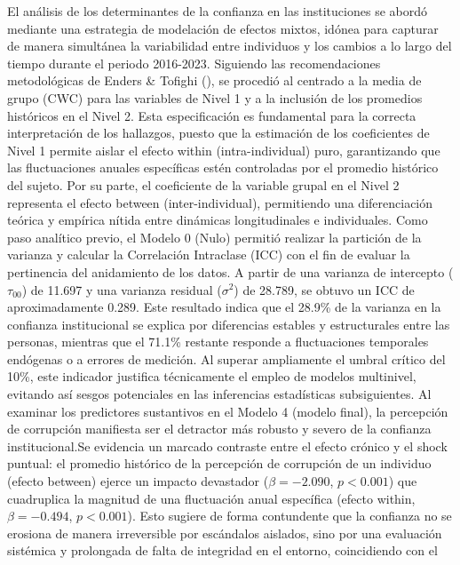 \documentclass[
  spanish,
  a4paper,
  oneside]{scrbook}
\begin{document}
El análisis de los determinantes de la confianza en las instituciones se
abordó mediante una estrategia de modelación de efectos mixtos, idónea
para capturar de manera simultánea la variabilidad entre individuos y
los cambios a lo largo del tiempo durante el periodo 2016-2023.
Siguiendo las recomendaciones metodológicas de Enders \& Tofighi
(), se procedió al centrado a
la media de grupo (CWC) para las variables de Nivel 1 y a la inclusión
de los promedios históricos en el Nivel 2. Esta especificación es
fundamental para la correcta interpretación de los hallazgos, puesto que
la estimación de los coeficientes de Nivel 1 permite aislar el efecto
within (intra-individual) puro, garantizando que las fluctuaciones
anuales específicas estén controladas por el promedio histórico del
sujeto. Por su parte, el coeficiente de la variable grupal en el Nivel 2
representa el efecto between (inter-individual), permitiendo una
diferenciación teórica y empírica nítida entre dinámicas longitudinales
e individuales. Como paso analítico previo, el Modelo 0 (Nulo) permitió
realizar la partición de la varianza y calcular la Correlación
Intraclase (ICC) con el fin de evaluar la pertinencia del anidamiento de
los datos. A partir de una varianza de intercepto (\(\tau_{00}\)) de
11.697 y una varianza residual (\(\sigma^2\)) de 28.789, se obtuvo un
ICC de aproximadamente 0.289. Este resultado indica que el 28.9\% de la
varianza en la confianza institucional se explica por diferencias
estables y estructurales entre las personas, mientras que el 71.1\%
restante responde a fluctuaciones temporales endógenas o a errores de
medición. Al superar ampliamente el umbral crítico del 10\%, este
indicador justifica técnicamente el empleo de modelos multinivel,
evitando así sesgos potenciales en las inferencias estadísticas
subsiguientes. Al examinar los predictores sustantivos en el Modelo 4
(modelo final), la percepción de corrupción manifiesta ser el detractor
más robusto y severo de la confianza institucional.Se evidencia un
marcado contraste entre el efecto crónico y el shock puntual: el
promedio histórico de la percepción de corrupción de un individuo
(efecto between) ejerce un impacto devastador (\(\beta = -2.090\),
\(p < 0.001\)) que cuadruplica la magnitud de una fluctuación anual
específica (efecto within, \(\beta = -0.494\), \(p < 0.001\)). Esto
sugiere de forma contundente que la confianza no se erosiona de manera
irreversible por escándalos aislados, sino por una evaluación sistémica
y prolongada de falta de integridad en el entorno, coincidiendo con el
\end{document}
